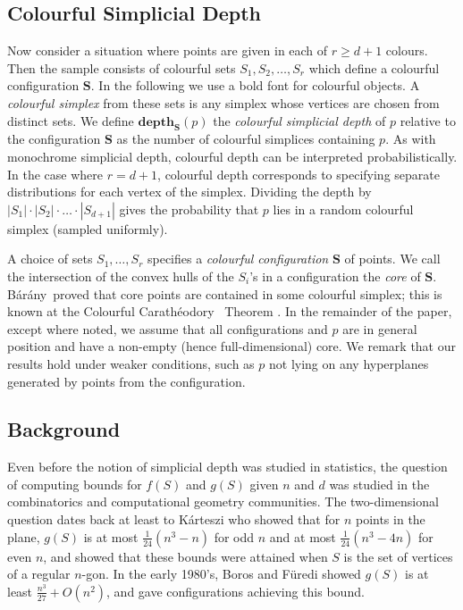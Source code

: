 \documentclass[epsbox,12pt,reqno]{amsart}
\theoremstyle{definition}
\theoremstyle{remark}
\def\csd{\mathbf{depth}}
\def\S{\mathbf{S}}
\def\bara{B\'ar\'any}
\def\cara{Carath\'eodory}
\begin{document}
\subsection{Colourful Simplicial Depth}\label{se:csd}
Now consider a situation where points are given in each of $r \ge d+1$
colours.  Then the sample consists of colourful sets 
$S_1, S_2, \ldots, S_r$ which define a colourful configuration $\S$.  
In the following we use a bold font for colourful objects.
A {\it colourful simplex} from these sets
is any simplex whose vertices are chosen from distinct sets.
We define $\csd_\S(p)$ the {\it colourful simplicial depth} of $p$ 
relative to the configuration $\S$ as the number of colourful simplices 
containing $p$.  As with monochrome simplicial depth, colourful
depth can be interpreted probabilistically.  In the case where 
$r = d+1$, colourful depth corresponds to specifying separate 
distributions for each vertex of the simplex.
Dividing the depth by $|S_1| \cdot |S_2| \cdot \ldots  \cdot|S_{d+1}|$ 
gives the probability that $p$ lies in a random colourful simplex
(sampled uniformly).

A choice of sets $S_1, \ldots, S_r$ specifies a {\it colourful
configuration} $\S$ of points.  We call the intersection of the 
convex hulls of the $S_i$'s in a configuration
the {\it core} of $\S$.  \bara~proved
that core points are contained in some colourful simplex; 
this is known at the Colourful \cara~ Theorem \cite{Bar82}.
In the remainder of the paper, 
except where noted, we assume that all configurations and $p$ are in general
position and have a non-empty (hence full-dimensional) core.  
We remark that our results hold under weaker conditions, such as
$p$ not lying on any hyperplanes generated by points from the
configuration.

\subsection{Background}\label{se:background}
Even before the notion of simplicial depth was studied in statistics,
the question of computing bounds for $f(S)$ and $g(S)$ given $n$ and $d$
was studied in
the combinatorics and computational geometry communities.
The two-dimensional question dates back at least to K{\'a}rteszi \cite{Kar55}
who showed that for $n$ points in the plane, $g(S)$ is at most
$\frac{1}{24}(n^3-n)$ for odd $n$ and at most $\frac{1}{24}(n^3-4n)$ 
for even $n$, 
and showed that these bounds were attained when $S$ is the set of
vertices of a regular $n$-gon.
In the early 1980's, Boros and F{\"u}redi \cite{BF84} 
showed $g(S)$ is at least $\frac{n^3}{27} + O(n^2)$, and gave configurations
achieving this bound.
\end{document}
